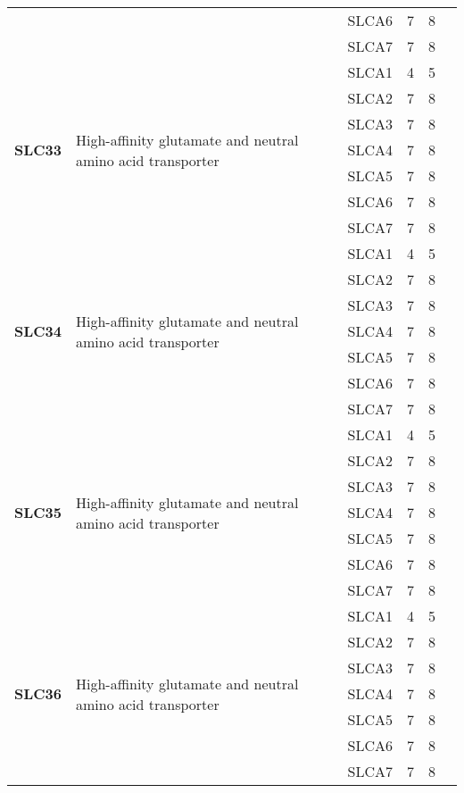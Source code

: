 \documentclass[12pt]{report}
\begin{document}
\begin{center}
\begin{longtable}{|p{1.5cm}|p{3.2cm}|p{1.9cm}|p{1.65cm}|p{3cm}|p{3cm}|}
\cline{3-6}
&&SLCA6&7 & 8&\\ 
\cline{3-6}
&&SLCA7&7 & 8&\\ 
\hline
\multirow{7}{1.5cm}{\textbf{SLC33}} & \multirow{7}{4cm}{High-affinity glutamate and neutral amino acid transporter} & SLCA1 & 4 & 5\\ 
\cline{3-6}
&&SLCA2&7 & 8&\\ 
\cline{3-6}
&&SLCA3&7 & 8&\\ 
\cline{3-6}
&&SLCA4&7 & 8&\\ 
\cline{3-6}
&&SLCA5&7 & 8&\\ 
\cline{3-6}
&&SLCA6&7 & 8&\\ 
\cline{3-6}
&&SLCA7&7 & 8&\\ 
\hline
\multirow{7}{1.5cm}{\textbf{SLC34}} & \multirow{7}{4cm}{High-affinity glutamate and neutral amino acid transporter} & SLCA1 & 4 & 5\\ 
\cline{3-6}
&&SLCA2&7 & 8&\\ 
\cline{3-6}
&&SLCA3&7 & 8&\\ 
\cline{3-6}
&&SLCA4&7 & 8&\\ 
\cline{3-6}
&&SLCA5&7 & 8&\\ 
\cline{3-6}
&&SLCA6&7 & 8&\\ 
\cline{3-6}
&&SLCA7&7 & 8&\\ 
\hline
\multirow{7}{1.5cm}{\textbf{SLC35}} & \multirow{7}{4cm}{High-affinity glutamate and neutral amino acid transporter} & SLCA1 & 4 & 5\\ 
\cline{3-6}
&&SLCA2&7 & 8&\\ 
\cline{3-6}
&&SLCA3&7 & 8&\\ 
\cline{3-6}
&&SLCA4&7 & 8&\\ 
\cline{3-6}
&&SLCA5&7 & 8&\\ 
\cline{3-6}
&&SLCA6&7 & 8&\\ 
\cline{3-6}
&&SLCA7&7 & 8&\\ 
\hline
\multirow{7}{1.5cm}{\textbf{SLC36}} & \multirow{7}{4cm}{High-affinity glutamate and neutral amino acid transporter} & SLCA1 & 4 & 5\\ 
\cline{3-6}
&&SLCA2&7 & 8&\\ 
\cline{3-6}
&&SLCA3&7 & 8&\\ 
\cline{3-6}
&&SLCA4&7 & 8&\\ 
\cline{3-6}
&&SLCA5&7 & 8&\\ 
\cline{3-6}
&&SLCA6&7 & 8&\\ 
\cline{3-6}
&&SLCA7&7 & 8&\\ 

\end{longtable}
\end{center}
\end{document}
